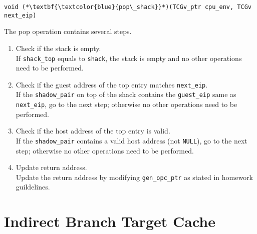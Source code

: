 \documentclass[12pt]{article}
\begin{document}
        \newpage
        
        \begin{lstlisting}[style=Function] 
            void (*\textbf{\textcolor{blue}{pop\_shack}}*)(TCGv_ptr cpu_env, TCGv next_eip)
        \end{lstlisting}
        The pop operation contains several steps.
        \begin{enumerate}
            \item Check if the stack is empty. \\
                If \verb|shack_top| equals to \verb|shack|, the stack is empty and no other operations need to be performed.

            \item Check if the guest address of the top entry matches \verb|next_eip|.  \\
                If the \verb|shadow_pair| on top of the shack contains the \verb|guest_eip| same as \verb|next_eip|,
                go to the next step; otherwise no other operations need to be performed.

            \item Check if the host address of the top entry is valid. \\
                If the \verb|shadow_pair| contains a valid host address (not \verb|NULL|),
                go to the next step; otherwise no other operations need to be performed.

            \item Update return address. \\
                Update the return address by modifying \verb|gen_opc_ptr| as stated in homework guildelines.
        \end{enumerate}


\section{Indirect Branch Target Cache}
\end{document}
